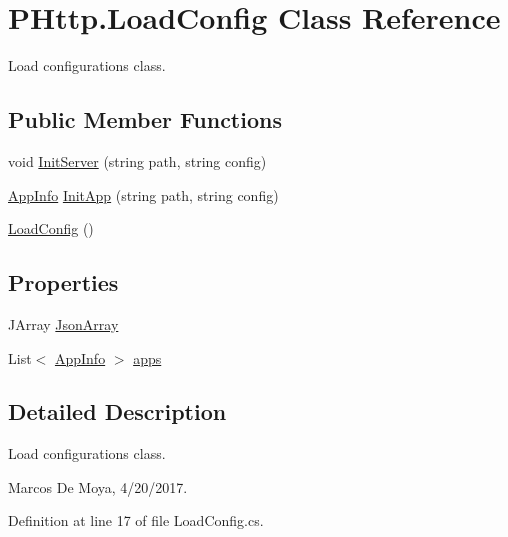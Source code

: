 \hypertarget{class_p_http_1_1_load_config}{}\section{P\+Http.\+Load\+Config Class Reference}
\label{class_p_http_1_1_load_config}


Load configurations class.  


\subsection*{Public Member Functions}
\begin{DoxyCompactItemize}
\item 
void \hyperlink{class_p_http_1_1_load_config_a1212ff435765e5dcb27f0d1ea18fcd6b}{Init\+Server} (string path, string config)
\item 
\hyperlink{class_p_http_1_1_app_info}{App\+Info} \hyperlink{class_p_http_1_1_load_config_a0739aa79b542e5dbbdbfbaab91b6dc9d}{Init\+App} (string path, string config)
\item 
\hyperlink{class_p_http_1_1_load_config_ae291bb7df4b6fb5c994f41c161e40177}{Load\+Config} ()
\end{DoxyCompactItemize}
\subsection*{Properties}
\begin{DoxyCompactItemize}
\item 
J\+Array \hyperlink{class_p_http_1_1_load_config_af6831370c3d47f652ed39a400860b3f4}{Json\+Array}
\item 
List$<$ \hyperlink{class_p_http_1_1_app_info}{App\+Info} $>$ \hyperlink{class_p_http_1_1_load_config_a5f79616cedb7fe86a95b869384779b1a}{apps}
\end{DoxyCompactItemize}


\subsection{Detailed Description}
Load configurations class. 

Marcos De Moya, 4/20/2017. 

Definition at line 17 of file Load\+Config.\+cs.



